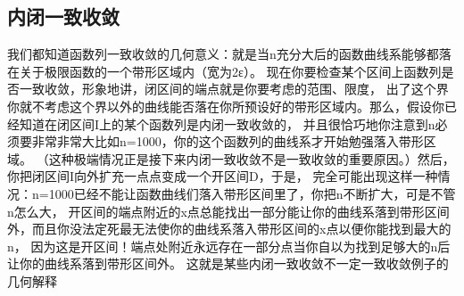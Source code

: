 \documentclass[fontset=windows]{article}
\begin{document}
   \subsection{内闭一致收敛}

   我们都知道函数列一致收敛的几何意义：就是当n充分大后的函数曲线系能够都落在关于极限函数的一个带形区域内（宽为2ε）。
   现在你要检查某个区间上函数列是否一致收敛，形象地讲，闭区间的端点就是你要考虑的范围、限度，
   出了这个界你就不考虑这个界以外的曲线能否落在你所预设好的带形区域内。那么，假设你已经知道在闭区间I上的某个函数列是内闭一致收敛的，
   并且很恰巧地你注意到n必须要非常非常大比如n=1000，你的这个函数列的曲线系才开始勉强落入带形区域。
   （这种极端情况正是接下来内闭一致收敛不是一致收敛的重要原因。）然后，你把闭区间I向外扩充一点点变成一个开区间D，于是，
   完全可能出现这样一种情况：n=1000已经不能让函数曲线们落入带形区间里了，你把n不断扩大，可是不管n怎么大，
   开区间的端点附近的x点总能找出一部分能让你的曲线系落到带形区间外，而且你没法定死最无法使你的曲线系落入带形区间的x点以便你能找到最大的n，
   因为这是开区间！端点处附近永远存在一部分点当你自以为找到足够大的n后让你的曲线系落到带形区间外。
   这就是某些内闭一致收敛不一定一致收敛例子的几何解释
\end{document}
